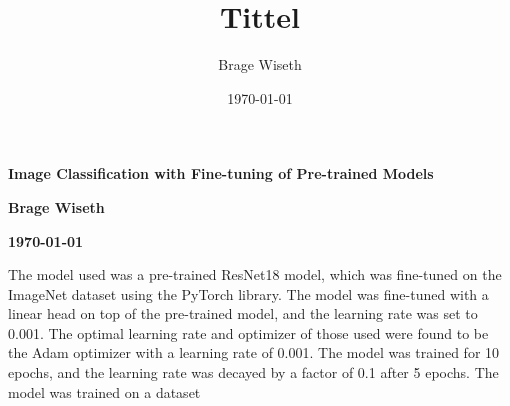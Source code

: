 \documentclass[twocolumn]{article}[9pt]
\title{Tittel}%
\author{Brage Wiseth}%
\date{\today}%
\begin{document}
%
\begin{strip}%
    \begin{center}
        \textbf{\LARGE Image Classification with Fine-tuning of Pre-trained Models}
    \end{center}
    \vspace{0.5em}
    \begin{center}
        \textbf{Brage Wiseth}
    \end{center}
    \begin{center}
        \textbf{\today}
    \end{center}
    \vspace{0.5em}


\end{strip}%
The model used was a pre-trained ResNet18 model, which was fine-tuned on the ImageNet dataset
using the PyTorch library. The model was fine-tuned with a linear head on top of the pre-trained
model, and the learning rate was set to 0.001. The optimal learning rate and optimizer of those
used were found to be the Adam optimizer with a learning rate of 0.001. The model was trained for
10 epochs, and the learning rate was decayed by a factor of 0.1 after 5 epochs. The model was
trained on a dataset
\end{document}

